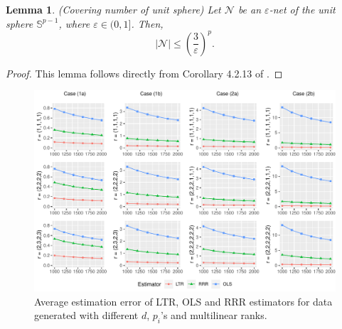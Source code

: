 \documentclass[12pt]{article}
\newtheorem{lemma}{Lemma}
\begin{document}
\begin{lemma} \label{lemma:covering}
	(Covering number of unit sphere) Let $\mathcal{N}$ be an $\varepsilon$-net of the unit sphere $\mathbb{S}^{p-1}$, where $\varepsilon\in(0,1]$. Then,
	\begin{equation}
	|\mathcal{N}|\leq\left(\frac{3}{\varepsilon}\right)^p.
	\end{equation}
\end{lemma}
\begin{proof}
This lemma follows directly from Corollary 4.2.13 of \cite{Vershynin2018}.
\end{proof}

\newpage




\clearpage
\newpage
\begin{figure}[t]
	\includegraphics[width=\textwidth]{Rplot_sim1.pdf}
	\caption{Average estimation error of LTR, OLS and RRR estimators for data generated with different $d$,  $p_i$'s and multilinear ranks.}\label{fg:simulation1}
\end{figure} 
\end{document}
